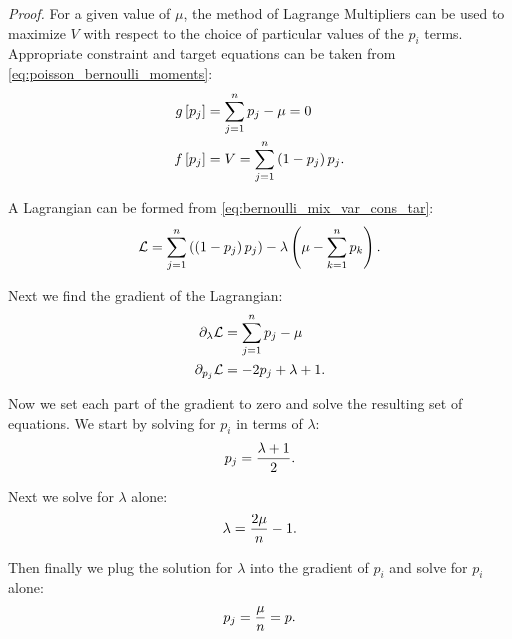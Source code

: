 \noindent
\textit{Proof.} For a given value of $\mu$, the method of Lagrange Multipliers can be used to maximize $V$ with respect to the choice of particular values of the $p_i$ terms. Appropriate constraint and target equations can be taken from \eqref{eq:poisson_bernoulli_moments}:
\begin{align}
    \label{eq:bernoulli_mix_var_cons_tar}
    \begin{split}
        g \left[ p_{j} \right] &= \sum _{j=1}^n p_{j} - \mu = 0 \\
        f \left[ p_{j} \right]&= V = \sum _{j=1}^n \left( 1 - p_{j} \right) p_{j}.
    \end{split}
\end{align}

A Lagrangian can be formed from \eqref{eq:bernoulli_mix_var_cons_tar}:
\begin{equation*}
    \mathcal{L}=\sum _{j=1}^n \left( \left( 1 - p_{j} \right) p_{j} \right) - \lambda  \left(\mu -\sum _{k=1}^n p_{k} \right).
\end{equation*}

Next we find the gradient of the Lagrangian:
\begin{align*}
    \partial_{\lambda} \mathcal{L}&=\sum _{j=1}^n p_{j}-\mu \\
    \partial_{p_{j}} \mathcal{L}&=-2 p_{j}+\lambda +1.
\end{align*}

Now we set each part of the gradient to zero and solve the resulting set of equations. We start by solving for $p_i$ in terms of $\lambda$:
\begin{equation*}
    p_{j}=\frac{\lambda +1}{2}.
\end{equation*}

Next we solve for $\lambda$ alone:
\begin{equation*}
    \lambda =\frac{2 \mu }{n}-1.
\end{equation*}

Then finally we plug the solution for $\lambda$ into the gradient of $p_i$ and solve for $p_i$ alone:
\begin{equation}
    \label{eq:poi_bern_maximizing_prob}
    p_{j} = \frac{\mu }{n} = p.
\end{equation}

